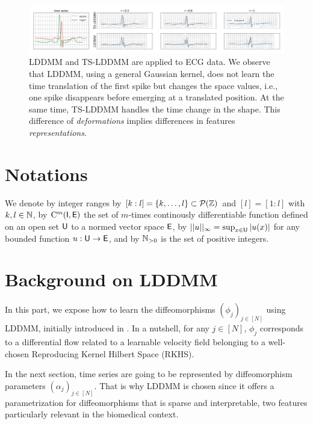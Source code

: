 \begin{figure}[t]
  \centering
  \includegraphics[width=\linewidth]{"./pictures/transport.jpeg"}
  
  \caption{LDDMM and TS-LDDMM are applied to ECG data.
  We observe that LDDMM, using a general Gaussian kernel, does not learn the time translation of the first spike but changes the space values, i.e., one spike disappears before emerging at a translated position. At the same time, TS-LDDMM handles the time change in the shape.
  This difference of \textit{deformations} implies differences in features \textit{representations}.   }
  \label{fig:transport}
  
\end{figure}

  \vspace{-1ex}
\section{Notations}
We denote by integer ranges by $[k:l]=\{k,\ldots,l\}\subset \mathcal{P}(\mathbb{Z})$ and $ [l]=[1:l]$ with $k,l\in \mathbb{N}$, by $\mathrm{C}^m(\mathsf{I},\mathsf{E})$ the set of $m$-times continously differentiable function defined on an open set $\mathsf{U}$ to a normed vector space $\mathsf{E}$, by $||u||_\infty=\sup_{x\in \mathsf{U}} |u(x)| $ for any bounded function $u:\mathsf{U} \to \mathsf{E}$, and by $\mathbb{N}_{>0}$ is the set of positive integers. 

\vspace{-1ex}
\section{Background on LDDMM}
\vspace{-1ex}
\label{section:LDDMM}

In this part, we expose how to learn the diffeomorphisms $(\phi_j)_{j\in[N]}$ using LDDMM, initially introduced in \cite{beg2005computing}. In a nutshell, for any $j\in [N]$, $\phi_j$ corresponds to a differential flow related to a learnable velocity field belonging to a well-chosen Reproducing Kernel Hilbert Space (RKHS).

In the next section, time series are going to be represented by diffeomorphism parameters $(\alpha_j)_{j\in[N]}$. That is why LDDMM is chosen since it offers a parametrization for diffeomorphisms that is sparse and interpretable, two features particularly relevant in the biomedical context.
 
